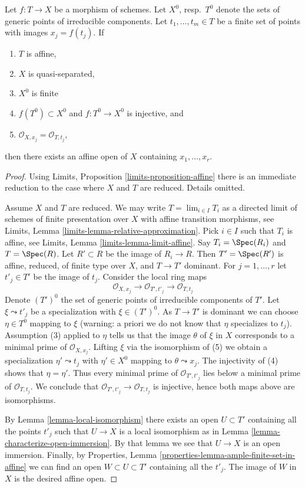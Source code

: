 \begin{lemma}
\label{lemma-points-in-affine}
Let $f : T \to X$ be a morphism of schemes. Let $X^0$, resp.\ $T^0$
denote the sets of generic points of irreducible components.
Let $t_1, \ldots, t_m \in T$ be a finite set of points
with images $x_j = f(t_j)$. If
\begin{enumerate}
\item $T$ is affine,
\item $X$ is quasi-separated,
\item $X^0$ is finite
\item $f(T^0) \subset X^0$ and $f : T^0 \to X^0$ is injective, and
\item $\mathcal{O}_{X, x_j} = \mathcal{O}_{T, t_j}$,
\end{enumerate}
then there exists an affine open of $X$ containing $x_1, \ldots, x_r$.
\end{lemma}

\begin{proof}
Using Limits, Proposition \ref{limits-proposition-affine}
there is an immediate reduction to the case where $X$ and $T$ are reduced.
Details omitted.

\medskip\noindent
Assume $X$ and $T$ are reduced. We may write $T = \lim_{i \in I} T_i$
as a directed limit of schemes of finite presentation over $X$
with affine transition morphisms, see
Limits, Lemma \ref{limits-lemma-relative-approximation}.
Pick $i \in I$ such that $T_i$ is affine, see
Limits, Lemma \ref{limits-lemma-limit-affine}.
Say $T_i = \Spec(R_i)$ and $T = \Spec(R)$.
Let $R' \subset R$ be the image of $R_i \to R$.
Then $T' = \Spec(R')$ is affine, reduced, of finite type over $X$,
and $T \to T'$ dominant. For $j = 1, \ldots, r$ let $t'_j \in T'$
be the image of $t_j$. Consider the local ring maps
$$
\mathcal{O}_{X, x_j} \to
\mathcal{O}_{T', t'_j} \to
\mathcal{O}_{T, t_j}
$$
Denote $(T')^0$ the set of generic points of irreducible
components of $T'$. Let $\xi \leadsto t'_j$ be a specialization with
$\xi \in (T')^0$. As $T \to T'$ is dominant we can choose $\eta \in T^0$ 
mapping to $\xi$ (warning: a priori we do not know that $\eta$ specializes
to $t_j$). Assumption (3) applied to $\eta$ tells us that the image $\theta$
of $\xi$ in $X$ corresponds to a minimal prime of $\mathcal{O}_{X, x_j}$.
Lifting $\xi$ via the isomorphism of (5) we obtain a specialization
$\eta' \leadsto t_j$ with $\eta' \in X^0$ mapping to $\theta \leadsto x_j$.
The injectivity of (4) shows that $\eta = \eta'$. Thus
every minimal prime of $\mathcal{O}_{T', t'_j}$ lies below
a minimal prime of $\mathcal{O}_{T, t_j}$. We conclude that
$\mathcal{O}_{T', t'_j} \to \mathcal{O}_{T, t_j}$ is injective,
hence both maps above are isomorphisms.

\medskip\noindent
By Lemma \ref{lemma-local-isomorphism} there exists an open
$U \subset T'$ containing all the points $t'_j$ such that
$U \to X$ is a local isomorphism as in
Lemma \ref{lemma-characterize-open-immersion}.
By that lemma we see that $U \to X$ is an open immersion.
Finally, by
Properties, Lemma \ref{properties-lemma-ample-finite-set-in-affine}
we can find an open $W \subset U \subset T'$
containing all the $t'_j$. The image of $W$ in $X$ is the
desired affine open.
\end{proof}

